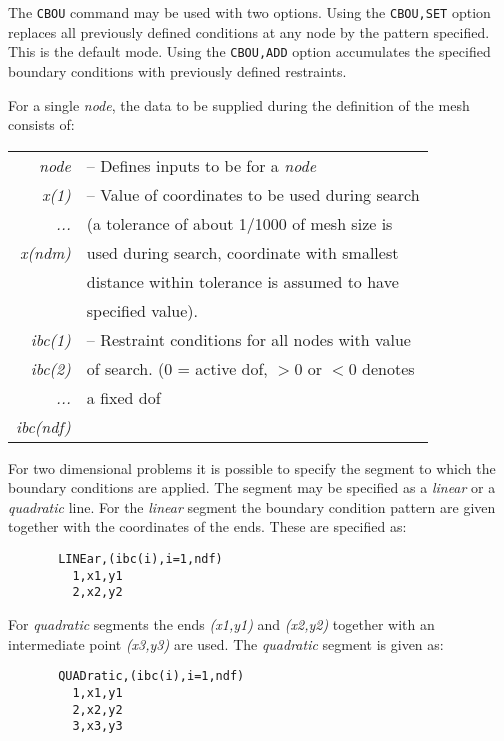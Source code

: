The {\tt CBOU} command may be used with two options.  Using the {\tt CBOU,SET}
option replaces all previously defined conditions at any node by the
pattern specified. This is the default mode.  Using the {\tt CBOU,ADD} option
accumulates the specified boundary conditions with previously defined
restraints.

For a single {\it node}, the data to be supplied during
the definition of the mesh consists of:

\begin{center}
\begin{tabular}{r l}
\it node   &-- Defines inputs to be for a {\it node} \\
\it x(1)   &-- Value of coordinates to be used during search \\
\it ...    &\quad (a tolerance of about 1/1000 of mesh size is \\
\it x(ndm) &\quad used during search, coordinate with smallest \\
           &\quad distance within tolerance is assumed to have \\
           &\quad specified value). \\
\it ibc(1) &-- Restraint conditions for all nodes with value \\
\it ibc(2) &\quad of search. (0 = active dof, $>$0 or $<$0 denotes \\
\it ...    &\quad a fixed dof \\
\it ibc(ndf) &
\end{tabular}
\end{center}
For two dimensional problems it is possible to
specify the segment to which the boundary conditions
are applied.  The segment may be specified as a {\it linear}
or a {\it quadratic} line.  For the {\it linear} segment the boundary
condition pattern are given together with the
coordinates of the ends.  These are specified as:

\begin{verbatim}
       LINEar,(ibc(i),i=1,ndf)
         1,x1,y1
         2,x2,y2
\end{verbatim}

For {\it quadratic} segments the ends {\it (x1,y1)} and {\it (x2,y2)}
together with an intermediate point {\it (x3,y3)} are used.
The {\it quadratic} segment is given as:

\begin{verbatim}
       QUADratic,(ibc(i),i=1,ndf)
         1,x1,y1
         2,x2,y2
         3,x3,y3
\end{verbatim}

